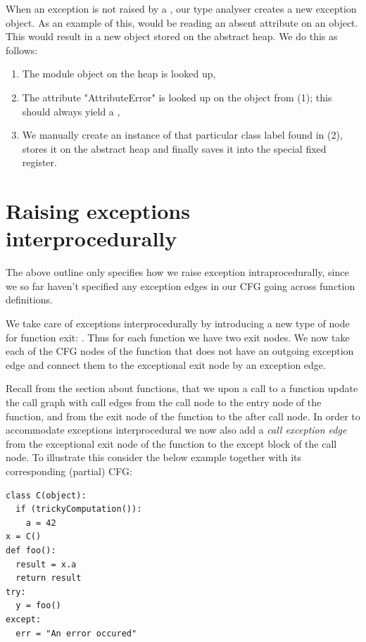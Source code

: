 When an exception is not raised by a , our type analyser creates a new exception object. As an example of this, would be reading an absent attribute on an object. This would result in a new  object stored on the abstract heap. We do this as follows:

\begin{enumerate}
	\item The  module object on the heap is looked up,
	\item The attribute "AttributeError" is looked up on the  object from (1); this should always yield a ,
	\item We manually create an instance of that particular class label found in (2), stores it on the abstract heap and finally saves it into the special fixed register.
\end{enumerate}


\section{Raising exceptions interprocedurally}
The above outline only specifies how we raise exception intraprocedurally, since we so far haven't specified any exception edges in our CFG going across function definitions.

We take care of exceptions interprocedurally by introducing a new type of node for function exit: . Thus for each function we have two exit nodes. We now take each of the CFG nodes of the function that does not have an outgoing exception edge and connect them to the exceptional exit node by an exception edge.

Recall from the section about functions, that we upon a call to a function update the call graph with call edges from the call node to the entry node of the function, and from the exit node of the function to the after call node. In order to accommodate exceptions interprocedural we now also add a \textit{call exception edge} from the exceptional exit node of the function to the except block of the call node. To illustrate this consider the below example together with its corresponding (partial) CFG:

\begin{listing}[H]
	\begin{verbatim}
class C(object):
  if (trickyComputation()):
    a = 42
x = C()
def foo():
  result = x.a
  return result
try:
  y = foo()
except:
  err = "An error occured"
	\end{verbatim}
\end{listing}

